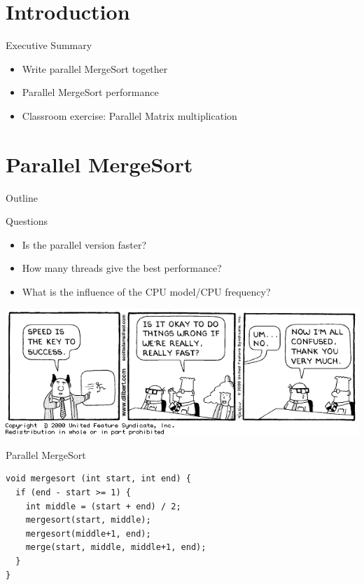 \section*{Introduction}

\begin{frame}{Executive Summary}
  \begin{itemize}
  \item Write parallel MergeSort together
  \item Parallel MergeSort performance
  \item Classroom exercise: Parallel Matrix multiplication
  \end{itemize}
\end{frame}


\section{Parallel MergeSort}

\begin{frame}{Outline}
  \tableofcontents[current]
\end{frame}

\begin{frame}{Questions}
  \begin{itemize}
  \item Is the parallel version faster?
  \item How many threads give the best performance?
  \item What is the influence of the CPU model/CPU frequency?
  \end{itemize}


  \begin{center}
    \includegraphics[scale=0.35]{figures/dilbert-1}
  \end{center}
\end{frame}

\begin{frame}[fragile]{Parallel MergeSort}
\begin{lstlisting}
void mergesort (int start, int end) {
  if (end - start >= 1) {
    int middle = (start + end) / 2;
    mergesort(start, middle);
    mergesort(middle+1, end);
    merge(start, middle, middle+1, end);
  }
}
\end{lstlisting}
\end{frame}

